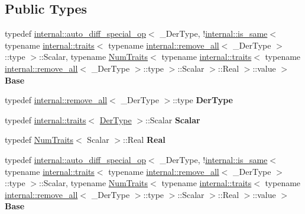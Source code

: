 \subsection*{Public Types}
\begin{DoxyCompactItemize}
\item 
\mbox{\label{class_eigen_1_1_auto_diff_scalar_a774eda299568916b03d067f41ca6af1a}} 
typedef \hyperlink{struct_eigen_1_1internal_1_1auto__diff__special__op}{internal\+::auto\+\_\+diff\+\_\+special\+\_\+op}$<$ \+\_\+\+Der\+Type, !\hyperlink{struct_eigen_1_1internal_1_1is__same}{internal\+::is\+\_\+same}$<$ typename \hyperlink{struct_eigen_1_1internal_1_1traits}{internal\+::traits}$<$ typename \hyperlink{struct_eigen_1_1internal_1_1remove__all}{internal\+::remove\+\_\+all}$<$ \+\_\+\+Der\+Type $>$\+::type $>$\+::Scalar, typename \hyperlink{group___core___module_struct_eigen_1_1_num_traits}{Num\+Traits}$<$ typename \hyperlink{struct_eigen_1_1internal_1_1traits}{internal\+::traits}$<$ typename \hyperlink{struct_eigen_1_1internal_1_1remove__all}{internal\+::remove\+\_\+all}$<$ \+\_\+\+Der\+Type $>$\+::type $>$\+::Scalar $>$\+::Real $>$\+::value $>$ {\bfseries Base}
\item 
\mbox{\label{class_eigen_1_1_auto_diff_scalar_a7ea1d465693962ab2cb9ee3e772b2712}} 
typedef \hyperlink{struct_eigen_1_1internal_1_1remove__all}{internal\+::remove\+\_\+all}$<$ \+\_\+\+Der\+Type $>$\+::type {\bfseries Der\+Type}
\item 
\mbox{\label{class_eigen_1_1_auto_diff_scalar_acdb01f45d302c5043d86d9852834df53}} 
typedef \hyperlink{struct_eigen_1_1internal_1_1traits}{internal\+::traits}$<$ \hyperlink{group___sparse_core___module}{Der\+Type} $>$\+::Scalar {\bfseries Scalar}
\item 
\mbox{\label{class_eigen_1_1_auto_diff_scalar_a64fdf441f87b9c3ff7e7b46bf2367ff5}} 
typedef \hyperlink{group___core___module_struct_eigen_1_1_num_traits}{Num\+Traits}$<$ Scalar $>$\+::Real {\bfseries Real}
\item 
\mbox{\label{class_eigen_1_1_auto_diff_scalar_a774eda299568916b03d067f41ca6af1a}} 
typedef \hyperlink{struct_eigen_1_1internal_1_1auto__diff__special__op}{internal\+::auto\+\_\+diff\+\_\+special\+\_\+op}$<$ \+\_\+\+Der\+Type, !\hyperlink{struct_eigen_1_1internal_1_1is__same}{internal\+::is\+\_\+same}$<$ typename \hyperlink{struct_eigen_1_1internal_1_1traits}{internal\+::traits}$<$ typename \hyperlink{struct_eigen_1_1internal_1_1remove__all}{internal\+::remove\+\_\+all}$<$ \+\_\+\+Der\+Type $>$\+::type $>$\+::Scalar, typename \hyperlink{group___core___module_struct_eigen_1_1_num_traits}{Num\+Traits}$<$ typename \hyperlink{struct_eigen_1_1internal_1_1traits}{internal\+::traits}$<$ typename \hyperlink{struct_eigen_1_1internal_1_1remove__all}{internal\+::remove\+\_\+all}$<$ \+\_\+\+Der\+Type $>$\+::type $>$\+::Scalar $>$\+::Real $>$\+::value $>$ {\bfseries Base}

\end{DoxyCompactItemize}
